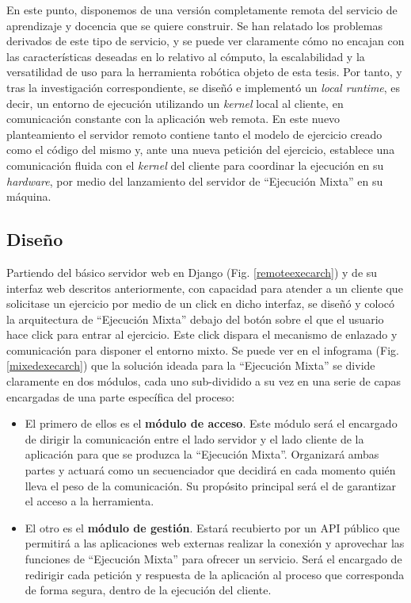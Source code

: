 En este punto, disponemos de una versión completamente remota del servicio de aprendizaje y docencia que se quiere construir. Se han relatado los problemas derivados de este tipo de servicio, y se puede ver claramente cómo no encajan con las características deseadas en lo relativo al cómputo, la escalabilidad y la versatilidad de uso para la herramienta robótica objeto de esta tesis. Por tanto, y tras la investigación correspondiente, se diseñó e implementó un \textit{local runtime}, es decir, un entorno de ejecución utilizando un \textit{kernel} local al cliente, en comunicación constante con la aplicación web remota. En este nuevo planteamiento el servidor remoto contiene tanto el modelo de ejercicio creado como el código del mismo y, ante una nueva petición del ejercicio, establece una comunicación fluida con el \textit{kernel} del cliente para coordinar la ejecución en su \textit{hardware}, por medio del lanzamiento del servidor de ``Ejecución Mixta'' en su máquina.

\subsection{Diseño}

Partiendo del básico servidor web en Django (Fig. \ref{remoteexecarch}) y de su interfaz web descritos anteriormente, con capacidad para atender a un cliente que solicitase un ejercicio por medio de un click en dicho interfaz, se diseñó y colocó la arquitectura de ``Ejecución Mixta'' debajo del botón sobre el que el usuario hace click para entrar al ejercicio. Este click dispara el mecanismo de enlazado y comunicación para disponer el entorno mixto. Se puede ver en el infograma (Fig. \ref{mixedexecarch}) que la solución ideada para la ``Ejecución Mixta'' se divide claramente en dos módulos, cada uno sub-dividido a su vez en una serie de capas encargadas de una parte específica del proceso:

\begin{itemize}
    \item [\textbullet] El primero de ellos es el \textbf{módulo de acceso}. Este módulo será el encargado de dirigir la comunicación entre el lado servidor y el lado cliente de la aplicación para que se produzca la ``Ejecución Mixta''. Organizará ambas partes y actuará como un secuenciador que decidirá en cada momento quién lleva el peso de la comunicación. Su propósito principal será el de garantizar el acceso a la herramienta.
    \item [\textbullet] El otro es el \textbf{módulo de gestión}. Estará recubierto por un API público que permitirá a las aplicaciones web externas realizar la conexión y aprovechar las funciones de ``Ejecución Mixta'' para ofrecer un servicio. Será el encargado de redirigir cada petición y respuesta de la aplicación al proceso que corresponda de forma segura, dentro de la ejecución del cliente.
\end{itemize}

